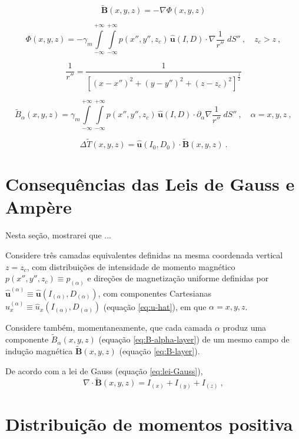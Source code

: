 \begin{equation}
\tilde{\mathbf{B}}(x, y, z) = - \nabla \Phi(x, y, z)
\label{eq:B-layer}
\end{equation}

\begin{equation}
\Phi(x, y, z) = - \gamma_{m} \int\limits_{-\infty}^{+\infty}\int\limits_{-\infty}^{+\infty} 
p(x'', y'', z_{c}) \, \hat{\mathbf{u}}(I, D) \cdot \nabla \frac{1}{r''} \; dS'' \: , \quad z_{c} > z \: ,
\label{eq:Phi-potential}
\end{equation}

\begin{equation}
\frac{1}{r''} = \frac{1}{\left[ (x - x'')^{2} + (y - y'')^{2} + (z - z_{c})^{2} \right]^{\frac{1}{2}}}
\label{eq:inv-r''}
\end{equation}

\begin{equation}
\tilde{B}_{\alpha}(x, y, z) = \gamma_{m} \int\limits_{-\infty}^{+\infty}\int\limits_{-\infty}^{+\infty} 
p(x'', y'', z_{c}) \, \hat{\mathbf{u}}(I, D) \cdot \partial_{\alpha} \nabla \frac{1}{r''} \; dS'' 
\: , \quad \alpha = x, y, z \: ,
\label{eq:B-alpha-layer}
\end{equation}

\begin{equation}
\Delta\tilde{T}(x, y, z) = \hat{\mathbf{u}}(I_{0}, D_{0}) \cdot \tilde{\mathbf{B}}(x, y, z) \: .
\label{eq:Delta-T-layer}
\end{equation}


\section{Consequências das Leis de Gauss e Amp{\`e}re}
\label{sec:Gauss-Ampere}

Nesta seção, mostrarei que ...

Considere três camadas equivalentes definidas na mesma coordenada vertical $z = z_{c}$, 
com distribuições de intensidade de momento magnético 
$p(x'', y'', z_{c}) \equiv p_{(\alpha)}$ e direções de magnetização uniforme definidas por 
$\hat{\mathbf{u}}^{(\alpha)} \equiv \hat{\mathbf{u}}(I_{(\alpha)}, D_{(\alpha)})$,
com componentes Cartesianas $\hat{u}^{(\alpha)}_{x} \equiv \hat{u}_{x}(I_{(\alpha)}, D_{(\alpha)})$
(equação \ref{eq:u-hat}), em que $\alpha = x, y, z$. 

Considere também, momentaneamente, que cada camada $\alpha$ produz uma componente 
$\tilde{B}_{\alpha}(x, y, z)$ (equação \ref{eq:B-alpha-layer}) de um mesmo 
campo de indução magnética $\tilde{\mathbf{B}}(x, y, z)$ (equação \ref{eq:B-layer}).

De acordo com a lei de Gauss (equação \ref{eq:lei-Gauss}),
\begin{equation}
\nabla \cdot \tilde{\mathbf{B}}(x, y, z) = I_{(x)} + I_{(y)} + I_{(z)} \: ,
\label{eq:lei-Gauss-layer}
\end{equation}



\section{Distribuição de momentos positiva}
\label{sec:distribuicao-positiva}
